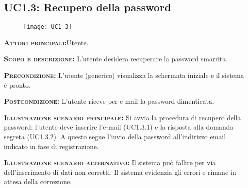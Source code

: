 \subsection{UC1.3: Recupero della password}
\begin{figure}[H]
\begin{center}
\texttt{[image: UC1-3]}
\caption{}\label{fig:}
\end{center}
\end{figure}
\begin{description}
\item{\scshape\bfseries Attori principali:}Utente.
\item{\scshape\bfseries Scopo e descrizione:} L'utente desidera recuperare la password smarrita.
\item{\scshape\bfseries Precondizione:} L'utente (generico) visualizza la schermata iniziale e il sistema è pronto.
\item{\scshape\bfseries Postcondizione:} L'utente riceve per e-mail la password dimenticata.
\item{\scshape\bfseries Illustrazione scenario principale:} Si avvia la procedura di recupero della password: l'utente deve inserire l'e-mail (UC1.3.1) e la risposta alla domanda segreta (UC1.3.2). A questo segue l'invio della password all'indirizzo email indicato in fase di registrazione.
\item{\scshape\bfseries Illustrazione scenario alternativo:} Il sistema può fallire per via dell'inserimento di dati non corretti. Il sistema evidenzia gli errori e rimane in attesa della correzione.
\end{description}

